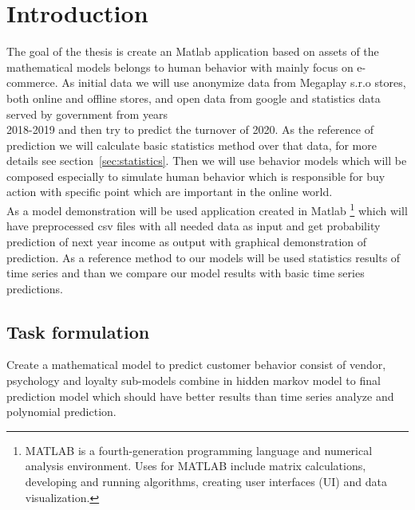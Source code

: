 
{}

\chapter*{Introduction}

The goal of the thesis is create an Matlab application based on assets of the mathematical models belongs to human behavior with mainly focus on e-commerce.
As initial data we will use anonymize data from Megaplay s.r.o stores, both online and offline stores, and open data from
google and statistics data served by government from years\\ 2018-2019 and then try to predict the turnover of 2020.
As the reference of prediction we will calculate basic statistics method over that data, for more details see section~\ref{sec:statistics}.
Then we will use behavior models which will be composed especially to simulate human behavior which is responsible for
buy action with specific point which are important in the online world.\\
As a model demonstration will be used application created in Matlab \footnote{MATLAB is a fourth-generation programming
language and numerical analysis environment.
Uses for MATLAB include matrix calculations, developing and running algorithms, creating user interfaces (UI) and data visualization.}
which will have preprocessed csv files with all needed data as input and get probability prediction of next year income
as output with graphical demonstration of prediction.
As a reference method to our models will be used statistics results of time series and than we compare our model results with
basic time series predictions.


\section*{Task formulation}

Create a mathematical model to predict customer behavior consist of vendor, psychology and loyalty sub-models combine in hidden markov model to final prediction model
which should have better results than time series analyze and polynomial prediction.
